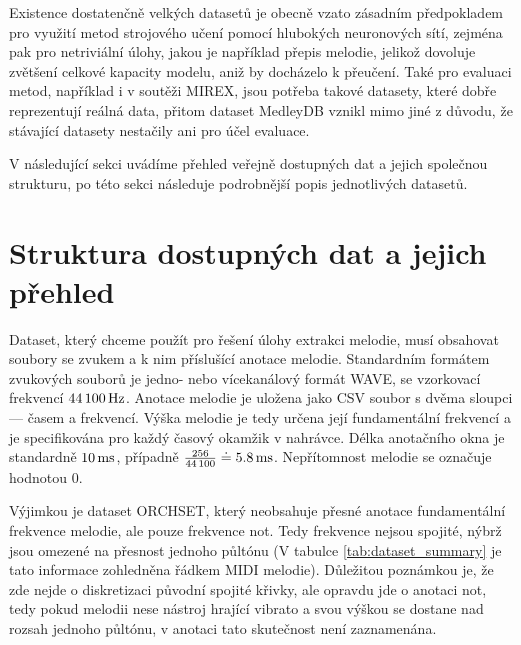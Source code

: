 Existence dostatenčně velkých datasetů je obecně vzato zásadním předpokladem pro využití metod strojového učení pomocí hlubokých neuronových sítí, zejména pak pro netriviální úlohy, jakou je například přepis melodie, jelikož dovoluje zvětšení celkové kapacity modelu, aniž by docházelo k přeučení. Také pro evaluaci metod, například i v soutěži MIREX, jsou potřeba takové datasety, které dobře reprezentují reálná data, přitom dataset MedleyDB vznikl mimo jiné z důvodu, že stávající datasety nestačily ani pro účel evaluace. 

V následující sekci uvádíme přehled veřejně dostupných dat a jejich společnou strukturu, po této sekci následuje podrobnější popis jednotlivých datasetů.




\section{Struktura dostupných dat a jejich přehled}

Dataset, který chceme použít pro řešení úlohy extrakci melodie, musí obsahovat soubory se zvukem a k nim příslušící anotace melodie. Standardním formátem zvukových souborů je jedno- nebo vícekanálový formát WAVE, se vzorkovací frekvencí $44\,100\,\rm Hz$. Anotace melodie je uložena jako CSV soubor s dvěma sloupci --- časem a frekvencí. Výška melodie je tedy určena její fundamentální frekvencí a je specifikována pro každý časový okamžik v nahrávce. Délka anotačního okna je standardně $10\,\rm ms$, případně $\frac{256}{44\,100} \doteq 5.8 \,\rm ms$. Nepřítomnost melodie se označuje hodnotou 0.

Výjimkou je dataset ORCHSET, který neobsahuje přesné anotace fundamentální frekvence melodie, ale pouze frekvence not. Tedy frekvence nejsou spojité, nýbrž jsou omezené na přesnost jednoho půltónu (V tabulce \ref{tab:dataset_summary} je tato informace zohledněna řádkem MIDI melodie). Důležitou poznámkou je, že zde nejde o diskretizaci původní spojité křivky, ale opravdu jde o anotaci not, tedy pokud melodii nese nástroj hrající vibrato a svou výškou se dostane nad rozsah jednoho půltónu, v anotaci tato skutečnost není zaznamenána. 

